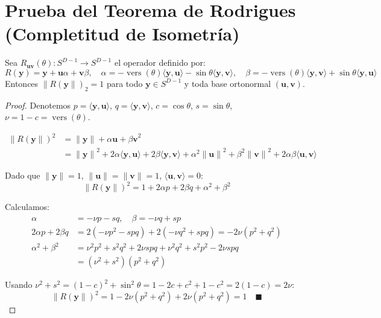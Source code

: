 \section{Prueba del Teorema de Rodrigues (Completitud de Isometría)}

\begin{theorem}
Sea $R_{\mathbf{u}\mathbf{v}}(\theta) : S^{D-1} \to S^{D-1}$ el operador definido por:
\begin{equation}
R(\mathbf{y}) = \mathbf{y} + \mathbf{u}\alpha + \mathbf{v}\beta, \quad
\alpha = -\operatorname{vers}(\theta)\langle\mathbf{y},\mathbf{u}\rangle - \sin\theta\langle\mathbf{y},\mathbf{v}\rangle, \quad
\beta = -\operatorname{vers}(\theta)\langle\mathbf{y},\mathbf{v}\rangle + \sin\theta\langle\mathbf{y},\mathbf{u}\rangle
\end{equation}
Entonces $\|{R(\mathbf{y}\|)}_2 = 1$ para todo $\mathbf{y} \in S^{D-1}$ y toda base ortonormal $(\mathbf{u},\mathbf{v})$.
\end{theorem}

\begin{proof}
Denotemos $p = \langle\mathbf{y},\mathbf{u}\rangle$, $q = \langle\mathbf{y},\mathbf{v}\rangle$,
$c = \cos\theta$, $s = \sin\theta$, $\nu = 1 - c = \operatorname{vers}(\theta)$.

\begin{align}
\|{R(\mathbf{y}\|)}^2 &= \|{\mathbf{y}\| + \alpha\mathbf{u} + \beta\mathbf{v}}^2 \\
&= \|{\mathbf{y}\|}^2 + 2\alpha\langle\mathbf{y},\mathbf{u}\rangle + 2\beta\langle\mathbf{y},\mathbf{v}\rangle + \alpha^2\|{\mathbf{u}\|}^2 + \beta^2\|{\mathbf{v}\|}^2 + 2\alpha\beta\langle\mathbf{u},\mathbf{v}\rangle
\end{align}

Dado que $\|{\mathbf{y}\|} = 1$, $\|{\mathbf{u}\|} = \|{\mathbf{v}\|} = 1$, $\langle\mathbf{u},\mathbf{v}\rangle = 0$:
\begin{equation}
\|{R(\mathbf{y}\|)}^2 = 1 + 2\alpha p + 2\beta q + \alpha^2 + \beta^2
\end{equation}

Calculamos:
\begin{align}
\alpha &= -\nu p - sq, \quad \beta = -\nu q + sp \\
2\alpha p + 2\beta q &= 2(-\nu p^2 - spq) + 2(-\nu q^2 + spq) = -2\nu(p^2 + q^2) \\
\alpha^2 + \beta^2 &= \nu^2 p^2 + s^2q^2 + 2\nu spq + \nu^2q^2 + s^2p^2 - 2\nu spq \\
&= (\nu^2 + s^2)(p^2 + q^2)
\end{align}

Usando $\nu^2 + s^2 = (1-c)^2 + \sin^2\theta = 1 - 2c + c^2 + 1 - c^2 = 2(1-c) = 2\nu$:
\begin{equation}
\|{R(\mathbf{y}\|)}^2 = 1 - 2\nu(p^2+q^2) + 2\nu(p^2+q^2) = 1 \quad \blacksquare
\end{equation}
\end{proof}

